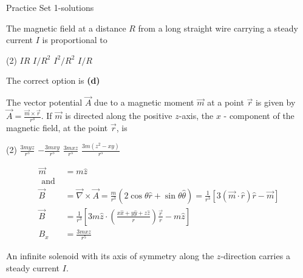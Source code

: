 
\begin{abox}
	Practice Set 1-solutions
	\end{abox}
\begin{enumerate}
\begin{minipage}{\textwidth}
	\item The magnetic field at a distance $R$ from a long straight wire carrying a steady current $I$ is proportional to
\end{minipage}
\begin{tasks}(2)
	\task[\textbf{A.}] $I R$
	\task[\textbf{B.}] $I / R^{2}$
	\task[\textbf{C.}]$I^{2} / R^{2}$
	\task[\textbf{D.}]$I / R$
\end{tasks}
\begin{answer}
	The correct option is \textbf{(d)}	
\end{answer}
\begin{minipage}{\textwidth}
	\item The vector potential $\vec{A}$ due to a magnetic moment $\vec{m}$ at a point $\vec{r}$ is given by $\vec{A}=\frac{\vec{m} \times \vec{r}}{r^{3}}$.
	If $\vec{m}$ is directed along the positive $z$-axis, the $x$ - component of the magnetic field, at the point $\vec{r}$, is
\end{minipage}
\begin{tasks}(2)
	\task[\textbf{A.}] $\frac{3 m y z}{r^{5}}$
	\task[\textbf{B.}] $-\frac{3 m x y}{r^{5}}$
	\task[\textbf{C.}]$\frac{3 m x z}{r^{5}}$
	\task[\textbf{D.}]$\frac{3 m\left(z^{2}-x y\right)}{r^{5}}$
\end{tasks}
\begin{answer}
	\begin{align*}
	\vec{m}&=m \hat{z}\\
	 \text { and }\\
	 \vec{B}&=\vec{\nabla} \times \vec{A}=\frac{m}{r^{3}}(2 \cos \theta \hat{r}+\sin \theta \hat{\theta})=\frac{1}{r^{3}}[3(\vec{m} \cdot \hat{r}) \hat{r}-\vec{m}] \\
 \vec{B}&=\frac{1}{r^{3}}\left[3 m \hat{z} \cdot\left(\frac{x \hat{x}+y \hat{y}+z \hat{z}}{r}\right) \frac{\vec{r}}{r}-m \hat{z}\right] \\
   B_{x}&=\frac{3 m x z}{r^{5}}
	\end{align*}
\end{answer}
\begin{minipage}{\textwidth}
	\item An infinite solenoid with its axis of symmetry along the $z$-direction carries a steady current $I$.

\end{minipage}
\end{enumerate}
